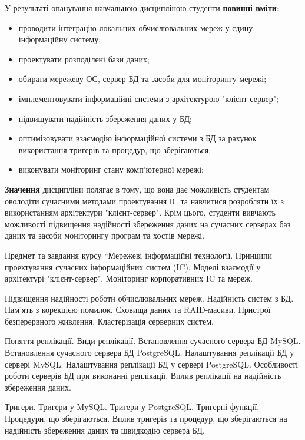 \documentclass[a4paper,14pt,ukrainian]{extarticle}
\begin{document}
У результаті опанування навчальною дисципліною студенти 
\textbf{повинні вміти}:
\begin{itemize}
\setlength{\parskip}{0pt}
\setlength{\parsep}{0pt}
\setlength{\itemsep}{1pt}
\item проводити інтеграцію локальних обчислювальних мереж у єдину інформаційну систему;
\item проектувати розподілені бази даних;
\item обирати мережеву ОС, сервер БД та засоби для моніторингу мережі;
\item імплементовувати  інформаційні системи з архітектурою "клієнт-сервер";
\item підвищувати надійність збереження даних у БД;
\item оптимізовувати взаємодію інформаційної системи з БД за рахунок використання тригерів та процедур, що зберігаються;
\item виконувати моніторинг стану комп'ютерної мережі;
\end{itemize}

\textbf{Значення} дисципліни полягає в тому, що вона дає можливість студентам оволодіти сучасними методами проектування ІС та навчитися розробляти їх з використанням архітектури "клієнт-сервер". Крім цього, студенти вивчають можливості підвищення надійності збереження даних на сучасних серверах баз даних та засоби моніторингу програм та хостів мережі.


Предмет та завдання курсу “Мережеві інформаційні технології. Принципи проектування сучасних інформаційних систем (IC). Моделі взаємодії у архітектурі "клієнт-сервер". Моніторинг корпоративних IC та мереж.

Підвищення надійності роботи обчислювальних мереж. Надійність систем з БД. Пам'ять з корекцією помилок. Сховища даних та RAID-масиви. Пристрої безперервного живлення. Кластерізація серверних систем.

Поняття реплікації. Види реплікації. Встановлення сучасного сервера БД MySQL.
Встановлення сучасного сервера БД PostgreSQL. Налаштування реплікації БД у сервері MySQL. Налаштування реплікації БД у сервері PostgreSQL. Особливості роботи серверів БД при виконанні реплікації. Вплив реплікації на надійність збереження даних.

Тригери. Тригери у MySQL. Тригери у PostgreSQL. Тригерні функції. Процедури, що зберігаються. Вплив тригерів та процедур, що зберігаються на надійність збереження даних та швидкодію сервера БД.
\end{document}
